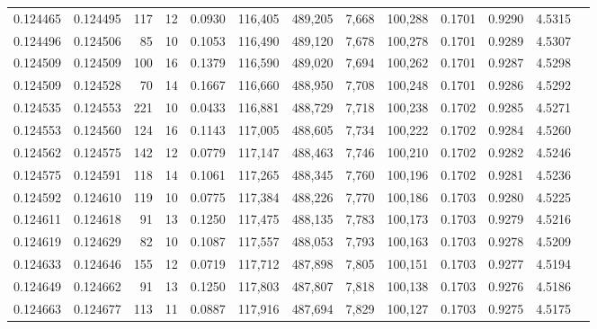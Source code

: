 \begin{tabular}{rrrrrrrrrrrrr}
0.124465 & 0.124495 &   117 &  12 &                                     0.0930 & 116,405 & 489,205 &   7,668 & 100,288 & 0.1701 & 0.9290 & 4.5315 \\
0.124496 & 0.124506 &    85 &  10 &                                     0.1053 & 116,490 & 489,120 &   7,678 & 100,278 & 0.1701 & 0.9289 & 4.5307 \\
0.124509 & 0.124509 &   100 &  16 &                                     0.1379 & 116,590 & 489,020 &   7,694 & 100,262 & 0.1701 & 0.9287 & 4.5298 \\
0.124509 & 0.124528 &    70 &  14 &                                     0.1667 & 116,660 & 488,950 &   7,708 & 100,248 & 0.1701 & 0.9286 & 4.5292 \\
0.124535 & 0.124553 &   221 &  10 &                                     0.0433 & 116,881 & 488,729 &   7,718 & 100,238 & 0.1702 & 0.9285 & 4.5271 \\
0.124553 & 0.124560 &   124 &  16 &                                     0.1143 & 117,005 & 488,605 &   7,734 & 100,222 & 0.1702 & 0.9284 & 4.5260 \\
0.124562 & 0.124575 &   142 &  12 &                                     0.0779 & 117,147 & 488,463 &   7,746 & 100,210 & 0.1702 & 0.9282 & 4.5246 \\
0.124575 & 0.124591 &   118 &  14 &                                     0.1061 & 117,265 & 488,345 &   7,760 & 100,196 & 0.1702 & 0.9281 & 4.5236 \\
0.124592 & 0.124610 &   119 &  10 &                                     0.0775 & 117,384 & 488,226 &   7,770 & 100,186 & 0.1703 & 0.9280 & 4.5225 \\
0.124611 & 0.124618 &    91 &  13 &                                     0.1250 & 117,475 & 488,135 &   7,783 & 100,173 & 0.1703 & 0.9279 & 4.5216 \\
0.124619 & 0.124629 &    82 &  10 &                                     0.1087 & 117,557 & 488,053 &   7,793 & 100,163 & 0.1703 & 0.9278 & 4.5209 \\
0.124633 & 0.124646 &   155 &  12 &                                     0.0719 & 117,712 & 487,898 &   7,805 & 100,151 & 0.1703 & 0.9277 & 4.5194 \\
0.124649 & 0.124662 &    91 &  13 &                                     0.1250 & 117,803 & 487,807 &   7,818 & 100,138 & 0.1703 & 0.9276 & 4.5186 \\
0.124663 & 0.124677 &   113 &  11 &                                     0.0887 & 117,916 & 487,694 &   7,829 & 100,127 & 0.1703 & 0.9275 & 4.5175 \\

\end{tabular}
